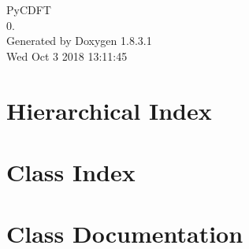 \documentclass{book}
\begin{document}
\hypersetup{pageanchor=false,citecolor=blue}
\begin{titlepage}
\vspace*{7cm}
\begin{center}
{\Large Py\-C\-D\-F\-T \\[1ex]\large 0. }\\
\vspace*{1cm}
{\large Generated by Doxygen 1.8.3.1}\\
\vspace*{0.5cm}
{\small Wed Oct 3 2018 13:11:45}\\
\end{center}
\end{titlepage}
\clearemptydoublepage
{}
\tableofcontents
\clearemptydoublepage
{}
\hypersetup{pageanchor=true,citecolor=blue}
\chapter{Hierarchical Index}

\chapter{Class Index}

\chapter{Class Documentation}











\printindex
\end{document}

